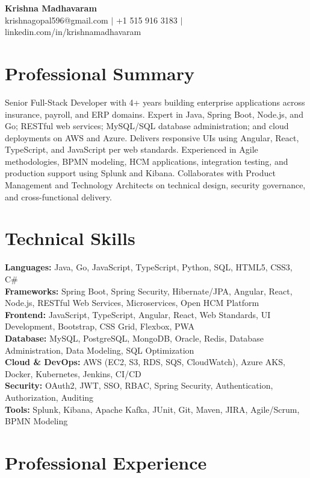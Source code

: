 \documentclass[10pt,a4paper]{article}
\begin{document}
\begin{center}
  {\Large\bfseries Krishna Madhavaram}\\[0.15cm]
  krishnagopal596@gmail.com $|$ +1 515 916 3183 $|$ linkedin.com/in/krishnamadhavaram
\end{center}
\vspace{-0.2cm}

\section{Professional Summary}

Senior Full-Stack Developer with 4+ years building enterprise applications across insurance, payroll, and ERP domains. Expert in Java, Spring Boot, Node.js, and Go; RESTful web services; MySQL/SQL database administration; and cloud deployments on AWS and Azure. Delivers responsive UIs using Angular, React, TypeScript, and JavaScript per web standards. Experienced in Agile methodologies, BPMN modeling, HCM applications, integration testing, and production support using Splunk and Kibana. Collaborates with Product Management and Technology Architects on technical design, security governance, and cross-functional delivery.

\section{Technical Skills}

\textbf{Languages:} Java, Go, JavaScript, TypeScript, Python, SQL, HTML5, CSS3, C\#\\
\textbf{Frameworks:} Spring Boot, Spring Security, Hibernate/JPA, Angular, React, Node.js, RESTful Web Services, Microservices, Open HCM Platform\\
\textbf{Frontend:} JavaScript, TypeScript, Angular, React, Web Standards, UI Development, Bootstrap, CSS Grid, Flexbox, PWA\\
\textbf{Database:} MySQL, PostgreSQL, MongoDB, Oracle, Redis, Database Administration, Data Modeling, SQL Optimization\\
\textbf{Cloud \& DevOps:} AWS (EC2, S3, RDS, SQS, CloudWatch), Azure AKS, Docker, Kubernetes, Jenkins, CI/CD\\
\textbf{Security:} OAuth2, JWT, SSO, RBAC, Spring Security, Authentication, Authorization, Auditing\\
\textbf{Tools:} Splunk, Kibana, Apache Kafka, JUnit, Git, Maven, JIRA, Agile/Scrum, BPMN Modeling

\section{Professional Experience}
\end{document}
